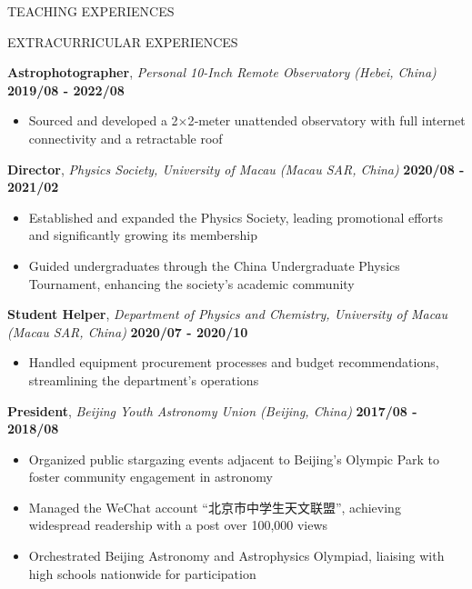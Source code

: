 \documentclass[11pt]{article} %
\begin{document}
\begin{section}{TEACHING EXPERIENCES}
\end{section}

\begin{section}{EXTRACURRICULAR EXPERIENCES}
    
\textbf{Astrophotographer}, \textit{Personal 10-Inch Remote Observatory (Hebei, China)} \hfill \textbf{2019/08 - 2022/08}
\begin{itemize}[leftmargin=1.5em]
    \item Sourced and developed a 2$\times$2‑meter unattended observatory with full internet connectivity and a retractable roof
\end{itemize}

\textbf{Director}, \textit{Physics Society, University of Macau (Macau SAR, China)} \hfill \textbf{2020/08 - 2021/02} 
\begin{itemize}[leftmargin=1.5em]
    \item Established and expanded the Physics Society, leading promotional efforts and significantly growing its membership
    \item Guided undergraduates through the China Undergraduate Physics Tournament, enhancing the society's academic community
\end{itemize}

\textbf{Student Helper}, \textit{Department of Physics and Chemistry, University of Macau (Macau SAR, China)} \hfill \textbf{2020/07 - 2020/10} 
\begin{itemize}[leftmargin=1.5em]
    \item Handled equipment procurement processes and budget recommendations, streamlining the department's operations
\end{itemize}

\textbf{President}, \textit{Beijing Youth Astronomy Union (Beijing, China)} \hfill \textbf{2017/08 - 2018/08} 
\begin{itemize}[leftmargin=1.5em]
    \item Organized public stargazing events adjacent to Beijing's Olympic Park to foster community engagement in astronomy
    \item Managed the WeChat account ``北京市中学生天文联盟'', achieving widespread readership with a post over 100,000 views
    \item Orchestrated Beijing Astronomy and Astrophysics Olympiad, liaising with high schools nationwide for participation
\end{itemize}


\end{section}
\end{document}
